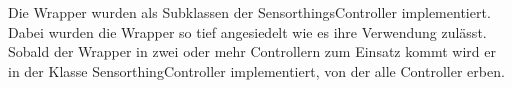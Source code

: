Die Wrapper wurden als Subklassen der SensorthingsController implementiert.
Dabei wurden die Wrapper so tief angesiedelt wie es ihre Verwendung zulässt.
Sobald der Wrapper in zwei oder mehr Controllern zum Einsatz kommt wird er in der Klasse SensorthingController implementiert, von der alle Controller erben.

